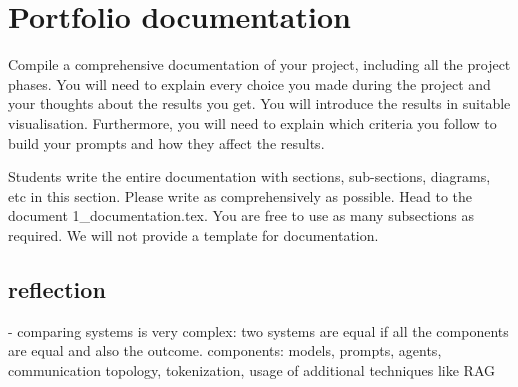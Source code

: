\setcounter{page}{1}
\section{Portfolio documentation}
\label{sec:documentation}

Compile a comprehensive documentation of your project, including all the project phases. You will need to explain every choice you made during the project and your thoughts about the results you get. You will introduce the results in suitable visualisation. Furthermore, you will need to explain which criteria you follow to build your prompts and how they affect the results. 

Students write the entire documentation with sections, sub-sections, diagrams, etc in this section. Please write as comprehensively as possible. Head to the document 1\_documentation.tex. You are free to use as many subsections as required. We will not provide a template for documentation. 







\subsection{reflection}

- comparing systems is very complex: two systems are equal if all the components are equal and also the outcome. components: models, prompts, agents, communication topology, tokenization, usage of additional techniques like RAG
